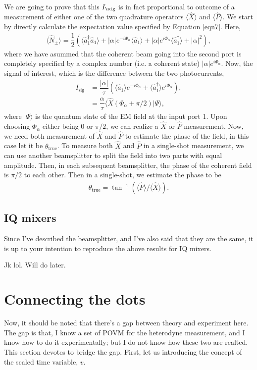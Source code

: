 \documentclass{article}
\begin{document}
We are going to prove that this $I_{\sig}$ is in fact proportional to outcome of a measurement of either one of the two quadrature operators $\langle\hat{X}\rangle$ and $\langle\hat{P}\rangle$. We start by directly calculate the expectation value specified by Equation \ref{eqn7}. Here,
\begin{align}
    \langle\hat{N}_{\pm}\rangle = \dfrac{1}{2}\left(\langle\hat{a}_1^\dagger\hat{a}_1\rangle + |\alpha|e^{-i\Phi_{\alpha}}\langle \hat{a}_1\rangle + |\alpha|e^{i\Phi_{\alpha}}\langle \hat{a}_1^\dagger\rangle + |\alpha|^2\right),
\end{align}
where we have asummed that the coherent beam going into the second port is completely specified by a complex number (i.e. a coherent state) $|\alpha|e^{i\Phi_{\alpha}}$. Now, the signal of interest, which is the difference between the two photocurrents,
\begin{align}
    I_{\text{sig}} &= \dfrac{|\alpha|}{\tau}\left(\langle\hat{a}_1\rangle e^{-i\Phi_\alpha}+\langle\hat{a}_1^\dagger\rangle e^{i\Phi_\alpha}\right),\\
    &=\dfrac{\alpha}{\tau}\langle \hat{X}(\Phi_\alpha+\pi/2)|\Psi\rangle,
\end{align}
where $|\Psi\rangle$ is the quantum state of the EM field at the input port 1. Upon choosing $\Phi_\alpha$ either being 0 or $\pi/2$, we can realize a $\hat{X}$ or $\hat{P}$ measurement. Now, we need both measurement of $\hat{X}$ and $\hat{P}$ to estimate the phase of the field, in this case let it be $\theta_{\text{true}}$. To measure both $\hat{X}$ and $\hat{P}$ in a single-shot measurement, we can use another beamsplitter to split the field into two parts with equal amplitude. Then, in each subsequent beamsplitter, the phase of the coherent field is $\pi/2$ to each other. Then in a single-shot, we estimate the phase to be
\begin{align}
    \theta_{\text{true}} = \tan^{-1}\left(\langle\hat{P}\rangle/\langle\hat{X}\rangle\right). 
\end{align}
\subsection{IQ mixers}
Since I've described the beamsplitter, and I've also said that they are the same, it is up to your intention to reproduce the above results for IQ mixers. 

Jk lol. Will do later.

\section{Connecting the dots}
Now, it should be noted that there's a gap between theory and experiment here. The gap is that, I know a set of POVM for the heterodyne measurement, and I know how to do it experimentally; but I do not know how these two are realted. This section devotes to bridge the gap. First, let us introducing the concept of the scaled time variable, $v$.
\end{document}
